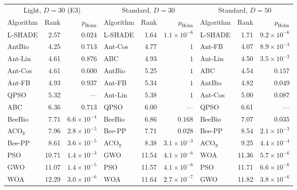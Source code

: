 \begin{tabular}{lrrlrrlrr}
\toprule
\multicolumn{3}{c}{Light, $D=30$ (E3)} & \multicolumn{3}{c}{Standard, $D=30$} & \multicolumn{3}{c}{Standard, $D=50$} \\
Algorithm & Rank & $p_{\mathrm{Holm}}$ & Algorithm & Rank & $p_{\mathrm{Holm}}$ & Algorithm & Rank & $p_{\mathrm{Holm}}$ \\
\midrule
L-SHADE & 2.57 & $0.024$ & L-SHADE & 1.64 & $1.1\times10^{-6}$ & L-SHADE & 1.71 & $9.2\times10^{-6}$ \\
AntBio & 4.25 & $0.713$ & Ant-Cos & 4.77 & $1$ & Ant-FB & 4.07 & $8.9\times10^{-3}$ \\
Ant-Lin & 4.61 & $0.876$ & ABC & 4.93 & $1$ & Ant-Lin & 4.50 & $3.5\times10^{-3}$ \\
Ant-Cos & 4.61 & $0.600$ & AntBio & 5.25 & $1$ & ABC & 4.54 & $0.157$ \\
Ant-FB & 4.93 & $0.937$ & Ant-FB & 5.34 & $1$ & AntBio & 4.82 & $0.049$ \\
QPSO & 5.32 & --- & Ant-Lin & 5.38 & $1$ & Ant-Cos & 5.00 & $0.087$ \\
ABC & 6.36 & $0.713$ & QPSO & 6.00 & --- & QPSO & 6.61 & --- \\
BeeBio & 7.71 & $6.6\times10^{-4}$ & BeeBio & 6.86 & $0.168$ & BeeBio & 7.07 & $0.035$ \\
ACO$_\mathbb{R}$ & 7.96 & $2.8\times10^{-5}$ & Bee-PP & 7.71 & $0.028$ & Bee-PP & 8.54 & $2.1\times10^{-3}$ \\
Bee-PP & 8.61 & $3.6\times10^{-5}$ & ACO$_\mathbb{R}$ & 8.38 & $3.1\times10^{-3}$ & ACO$_\mathbb{R}$ & 9.25 & $4.4\times10^{-4}$ \\
PSO & 10.71 & $1.4\times10^{-3}$ & GWO & 11.54 & $4.1\times10^{-6}$ & WOA & 11.36 & $5.7\times10^{-6}$ \\
GWO & 11.07 & $1.4\times10^{-5}$ & PSO & 11.57 & $4.1\times10^{-6}$ & PSO & 11.71 & $6.6\times10^{-6}$ \\
WOA & 12.29 & $3.0\times10^{-6}$ & WOA & 11.64 & $2.7\times10^{-7}$ & GWO & 11.82 & $3.8\times10^{-6}$ \\
\bottomrule
\end{tabular}
